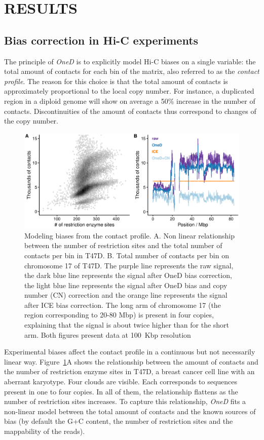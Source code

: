 \documentclass[a4,center,fleqn]{NAR}
\begin{document}
\section{RESULTS}

\subsection{Bias correction in Hi-C experiments}

The principle of \textit{OneD} is to explicitly model Hi-C biases on a
single variable: the total amount of contacts for each bin of the matrix,
also referred to as the \textit{contact profile}. The reason for this
choice is that the total amount of contacts is approximately proportional
to the local copy number. For instance, a duplicated region in a diploid
genome will show on average a 50\% increase in the number of contacts.
Discontinuities of the amount of contacts thus correspond to changes of
the copy number.

\begin{figure}
\centerline{\includegraphics[width=.49\textwidth]
  {nar_figures/figure_1.eps}}
\caption{Modeling biases from the contact profile. A. Non linear
relationship between the number of restriction sites and the total number
of contacts per bin in T47D. B. Total number of contacts per bin on
chromosome 17 of T47D. The purple line represents the raw signal, the dark blue
line represents the signal after OneD bias correction, the light blue line
represents the signal after OneD bias and copy number (CN) correction and
the orange line represents the signal after ICE bias correction. The long arm
of chromosome 17 (the region corresponding to 20-80 Mbp) is present in
four copies, explaining that the signal is about twice higher than for
the short arm. Both figures present data at 100~Kbp resolution}
\label{fig:totals}
\end{figure}


Experimental biases affect the contact profile in a continuous but not
necessarily linear way. Figure~\ref{fig:totals}A shows the relationship
between the amount of contacts and the number of restriction enzyme sites
in T47D, a breast cancer cell line with an aberrant karyotype.  Four
clouds are visible. Each corresponds to sequences present in one to four
copies. In all of them, the relationship flattens as the number of
restriction sites increases. To capture this relationship, \textit{OneD}
fits a non-linear model between the total amount of contacts and the known
sources of bias (by default the G+C content, the number of restriction
sites and the mappability of the reads).
\end{document}
